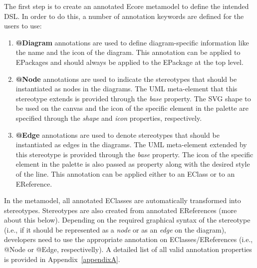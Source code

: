 The first step is to create an annotated Ecore metamodel to define the intended DSL.
In order to do this, a number of annotation keywords are defined for the users to use:

\begin{enumerate}[label=\arabic*.]
	\item \textbf{@Diagram} annotations are used to define diagram-specific information like the name and the icon of the diagram. This annotation can be applied to EPackages and should always be applied to the EPackage at the top level.
	\item \textbf{@Node} annotations are used to indicate the stereotypes that should be instantiated as nodes in the diagrams. 
	The UML meta-element that this stereotype extends is provided through the \emph{base} property. 
	The SVG shape to be used on the canvas and the icon of the specific element in the palette are specified through the \emph{shape} and \emph{icon} properties, respectively. 
	\item \textbf{@Edge} annotations are used to denote stereotypes that should be instantiated as edges in the diagrams. 
	The UML meta-element extended by this stereotype is provided through the \emph{base} property. The icon of the specific element in the palette is also passed as property along with the desired style of the line. 
	This annotation can be applied either to an EClass or to an EReference.
\end{enumerate}

In the metamodel, all annotated EClasses are automatically transformed into stereotypes.
Stereotypes are also created from annotated EReferences (more about this below). 
Depending on the required graphical syntax of the stereotype (i.e., if it should be represented as a \textit{node} or as an \textit{edge} on the diagram), developers need to use the appropriate annotation on EClasses/EReferences (i.e., @Node or @Edge, respectivelly). 
A detailed list of all valid annotation properties is provided in Appendix~\ref{appendixA}. 

